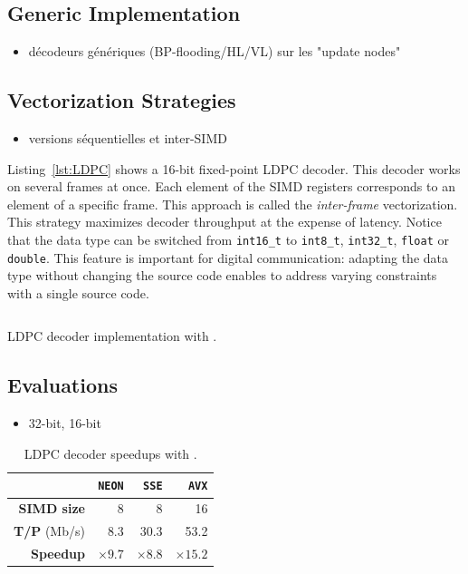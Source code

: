\subsection{Generic Implementation}

\begin{itemize}
  \item décodeurs génériques (BP-flooding/HL/VL) sur les "update nodes"
\end{itemize}

\subsection{Vectorization Strategies}

\begin{itemize}
  \item versions séquentielles et inter-SIMD
\end{itemize}

Listing~\ref{lst:LDPC} shows a 16-bit fixed-point LDPC decoder. This decoder
works on several frames at once. Each element of the SIMD registers corresponds
to an element of a specific frame. This approach is called the
\textit{inter-frame} vectorization. This strategy maximizes decoder throughput
at the expense of latency. Notice that the data type can be switched from
\verb|int16_t| to \verb|int8_t|, \verb|int32_t|, \verb|float| or \verb|double|.
This \MIPP feature is important for digital communication: adapting the data
type without changing the source code enables to address varying constraints
with a single source code.

\begin{listing}
  \inputminted[frame=lines,linenos]{C++}{main/chapter2/src/ldpc/bp_min_sum.cpp}
  \caption{LDPC decoder implementation with \MIPP.}
  \label{lst:LDPC}
\end{listing}

\subsection{Evaluations}

\begin{itemize}
  \item 32-bit, 16-bit
\end{itemize}

\begin{table}
  \tabcolsep=6pt
  \centering
  \caption{LDPC decoder speedups with \MIPP.}
  \label{tab:sp_ldpc}
  {\small
  \begin{tabular}{r|r|r|r}
                      & \textbf{\texttt{NEON}} & \textbf{\texttt{SSE}} & \textbf{\texttt{AVX}} \\ \hline
  \textbf{SIMD size}  & 8                      & 8                     & 16                    \\ \hline
  \textbf{T/P} (Mb/s) & 8.3                    & 30.3                  & 53.2                  \\ \hline
  \textbf{Speedup}    & $\times 9.7$           & $\times 8.8$          & $\times 15.2$         \\
  \end{tabular}
  }
\end{table}

